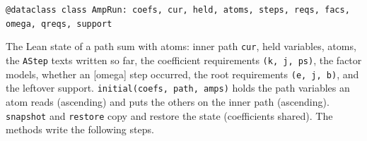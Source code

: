 \begin{signature}
\textnormal{\texttt{@dataclass class AmpRun: coefs,\allowbreak{} cur,\allowbreak{} held,\allowbreak{} atoms,\allowbreak{} steps,\allowbreak{} reqs,\allowbreak{} facs,\allowbreak{} omega,\allowbreak{} qreqs,\allowbreak{} support}}
\end{signature}
\noindent The Lean state of a path sum with atoms: inner path \textnormal{\texttt{cur}}, held variables, atoms,
the \textnormal{\texttt{AStep}} texts written so far, the coefficient requirements \textnormal{\texttt{(\allowbreak{}k,\allowbreak{} j,\allowbreak{} ps)}}, the factor
models, whether an [omega] step occurred, the root requirements \textnormal{\texttt{(\allowbreak{}e,\allowbreak{} j,\allowbreak{} b)}}, and the leftover
support. \textnormal{\texttt{initial(\allowbreak{}coefs,\allowbreak{} path,\allowbreak{} amps)}} holds the path variables an atom reads (ascending) and
puts the others on the inner path (ascending). \textnormal{\texttt{snapshot}} and \textnormal{\texttt{restore}} copy and restore the
state (coefficients shared). The methods write the following steps.
